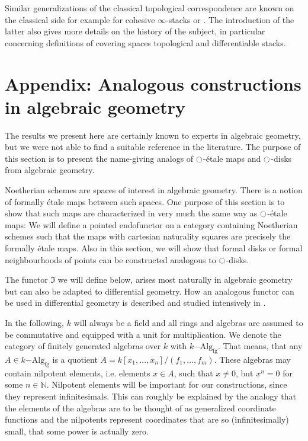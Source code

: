 \documentclass[9pt,twosided]{amsart}
\newcommand{\bN}{\mathbb N}
\begin{document}
Similar generalizations of the classical topological correspondence are known on the classical side
for example for cohesive $\infty$-stacks \cite[Section 5.2.7]{SchreiberDcct} or \cite{dmr-2covers}.
The introduction of the latter also gives more details on the history of the subject,
in particular concerning definitions of covering spaces topological and differentiable stacks.

\section*{Appendix: Analogous constructions in algebraic geometry}
\label{subsection:algebraic geometry}
The results we present here are certainly known to experts in algebraic geometry,
but we were not able to find a suitable reference in the literature.
The purpose of this section is to present the name-giving analogs of ${\ocircle}$-étale maps and ${\ocircle}$-disks from algebraic geometry.

Noetherian schemes are spaces of interest in algebraic geometry. There is a notion of formally étale maps between such spaces.
One purpose of this section is to show that such maps are characterized in very much the same way as ${\ocircle}$-étale maps:
We will define a pointed endofunctor on a category containing Noetherian schemes
such that the maps with cartesian naturality squares are precisely the formally étale maps.
Also in this section, we will show that formal disks or formal neighbourhoods of points can be constructed analogous to ${\ocircle}$-disks.

The functor $\Im$ we will define below, arises most naturally in algebraic geometry but can also be adapted to differential geometry.
How an analogous functor can be used in differential geometry is described and studied intensively in \cite{SyntheticPDEs}.

In the following, $k$ will always be a field and all rings and algebras are assumed to be commutative and equipped with a unit for multiplication.
We denote the category of finitely generated algebras over $k$ with $k\mathrm{-Alg}_{\mathrm{fg}}$.
That means, that any $A\in k\mathrm{-Alg}_{\mathrm{fg}}$ is a quotient $A=k[x_1,\dots,x_n]/(f_1,\dots,f_m)$.
These algebras may contain nilpotent elements, i.e. elements $x\in A$, such that $x\neq 0$, but $x^n=0$ for some $n\in\bN$.
Nilpotent elements will be important for our constructions, since they represent infinitesimals.
This can roughly be explained by the analogy
that the elements of the algebras are to be thought of as generalized coordinate functions
and the nilpotents represent coordinates that are so (infinitesimally) small, that some power is actually zero. 
\end{document}
